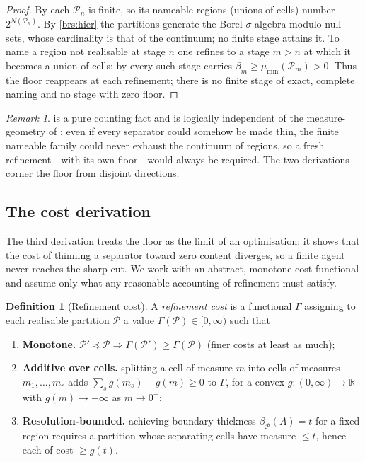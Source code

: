 \documentclass[11pt,twocolumn,a4paper]{article}
\theoremstyle{thmstyle}
\theoremstyle{definition}
\newtheorem{definition}[theorem]{Definition}
\theoremstyle{remark}
\newtheorem{remark}[theorem]{Remark}
\newcommand{\R}{\mathbb{R}}
\newcommand{\thick}{\beta}
\newcommand{\Part}{\mathscr{P}}
\begin{document}
\begin{proof}
By  each $\Part_n$ is finite, so its nameable regions
(unions of cells) number $2^{N(\Part_n)}$. By \ref{brs:hier} the partitions
generate the Borel $\sigma$-algebra modulo null sets, whose cardinality is that
of the continuum; no finite stage attains it. To name a region not realisable at
stage $n$ one refines to a stage $m>n$ at which it becomes a union of cells; by
 every such stage carries $\thick_m\ge\mu_{\min}(\Part_m)>0$.
Thus the floor reappears at each refinement; there is no finite stage of exact,
complete naming and no stage with zero floor.
\end{proof}

\begin{remark}
 is a pure counting fact and is logically independent of the
measure-geometry of : even if every separator could somehow
be made thin, the finite nameable family could never exhaust the continuum of
regions, so a fresh refinement---with its own floor---would always be required.
The two derivations corner the floor from disjoint directions.
\end{remark}

\subsection{The cost derivation}

The third derivation treats the floor as the limit of an optimisation: it shows
that the cost of thinning a separator toward zero content diverges, so a finite
agent never reaches the sharp cut. We work with an abstract, monotone cost
functional and assume only what any reasonable accounting of refinement must
satisfy.

\begin{definition}[Refinement cost]
\label{def:cost}
A \emph{refinement cost} is a functional $\Gamma$ assigning to each realisable
partition $\Part$ a value $\Gamma(\Part)\in[0,\infty)$ such that
\begin{enumerate}[label=\textup{(C\arabic*)},leftmargin=3em]
\item\label{c:mono} \textbf{Monotone.} $\Part'\preceq\Part\Rightarrow
\Gamma(\Part')\ge\Gamma(\Part)$ \textup{(}finer costs at least as much\textup{)};
\item\label{c:additive} \textbf{Additive over cells.} splitting a cell of
measure $m$ into cells of measures $m_1,\dots,m_r$ adds
$\sum_s g(m_s)-g(m)\ge0$ to $\Gamma$, for a convex $g\colon(0,\infty)\to\R$
with $g(m)\to+\infty$ as $m\to0^+$;
\item\label{c:reso} \textbf{Resolution-bounded.} achieving boundary thickness
$\thick_\Part(A)=t$ for a fixed region requires a partition whose separating
cells have measure $\le t$, hence each of cost $\ge g(t)$.
\end{enumerate}
\end{definition}
\end{document}
